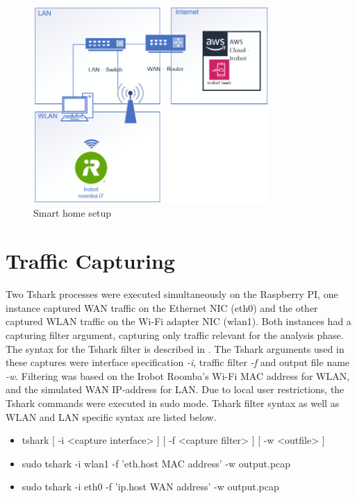 \begin{figure}[H]
    \centering
    \includegraphics[width=0.8\textwidth]{figures/SmartHomeSetup.png}
    \caption{Smart home setup}
    \label{fig:SmartHomeSetup}
\end{figure}

\section{Traffic Capturing} 

Two Tshark processes were executed simultaneously on the Raspberry PI, one instance captured WAN traffic on the Ethernet NIC (eth0) and the other captured WLAN traffic on the Wi-Fi adapter NIC (wlan1). Both instances had a capturing filter argument, capturing only traffic relevant for the analysis phase. The syntax for the Tshark filter is described in \cite{tshark_filter}. The Tshark arguments used in these captures were interface specification \textit{-i}, traffic filter \textit{-f} and output file name \textit{-w}. Filtering was based on the Irobot Roomba's Wi-Fi MAC address for WLAN, and the simulated WAN IP-address for LAN. Due to local user restrictions, the Tshark commands were executed in sudo mode. Tshark filter syntax as well as WLAN and LAN specific syntax are listed below. 

\begin{itemize}
    \item tshark [ -i <capture interface> ] [ -f <capture filter> ] [ -w <outfile> ]
    \item sudo tshark -i wlan1 -f 'eth.host MAC address' -w output.pcap
    \item sudo tshark -i eth0 -f 'ip.host WAN address' -w output.pcap
\end{itemize}

